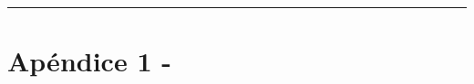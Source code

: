 \documentclass[11pt,a4paper]{article}
\begin{document}
\newpage
\begin{appendices}
\vspace{-1em}
\hrule
\vspace{1em}
\normalsize
\section{Apéndice 1 -}
\end{appendices}

\begin{multicols}{2}

\end{multicols}
\end{document}
